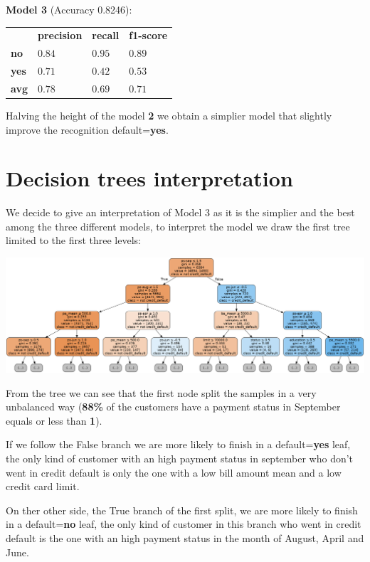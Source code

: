 \medskip

\textbf{Model 3} (Accuracy 0.8246):

\begin{table}[h]
\centering
\begin{adjustbox}{width=.30\textwidth}
\small
\begin{tabular}{llll}
               & \textbf{precision} & \textbf{recall} & \textbf{f1-score} \\ \rowcolor[HTML]{EFEFEF} 
 \textbf{no}   &  $0.84$            & $0.95$          & $0.89$            \\
 \textbf{yes}  &  $0.71$            & $0.42$          & $0.53$            \\ \rowcolor[HTML]{EFEFEF} 
 \textbf{avg}  &  $0.78$            & $0.69$          & $0.71$            \\
\end{tabular}
\end{adjustbox}
\end{table}

Halving the height of the model \textbf{2} we obtain a simplier model that slightly improve the recognition default=\textbf{yes}. 

\section{Decision trees interpretation}

We decide to give an interpretation of Model 3 as it is the simplier and the best among the three different models, to interpret the model we draw the first tree limited to the first three levels:

\medskip

  \begin{minipage}[h]{1\textwidth}
\medskip

  \centering
    \includegraphics[width=.7\textwidth]{img/ch5/model3}
\medskip

  \end{minipage}

\medskip

From the tree we can see that the first node split the samples in a very unbalanced way (\textbf{88\%} of the customers have a payment status in September equals or less than \textbf{1}). 

\smallskip

If we follow the False branch we are more likely to finish in a default=\textbf{yes} leaf, the only kind of customer with an high payment status in september who don't went in credit default is only the one with a low bill amount mean and a low credit card limit.

\smallskip

On ther other side, the True branch of the first split, we are more likely to finish in a default=\textbf{no} leaf, the only kind of customer in this branch who went in credit default is the one with an high payment status in the month of August, April and June.
